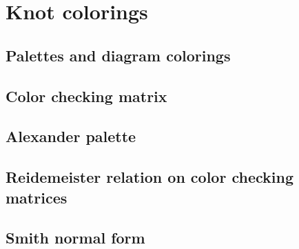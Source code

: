 \section{Knot colorings}\label{sec3}

\subsection{Palettes and diagram colorings}



\subsection{Color checking matrix}
\label{section 3.2}



\subsection{Alexander palette}



\subsection{Reidemeister relation on color checking matrices}



\subsection{Smith normal form}



